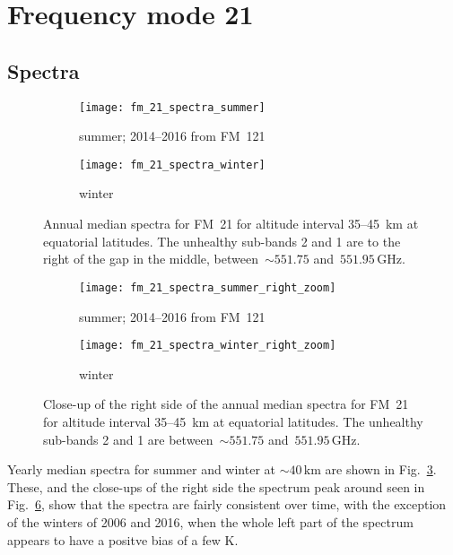 \section{Frequency mode 21}
\label{FM21}

\subsection{Spectra}
\label{FM21:spectra}

\begin{figure}[ht]
    \centering
    \begin{subfigure}[b]{0.9545\textwidth}
        \texttt{[image: fm\_21\_spectra\_summer]}
        \caption{summer; 2014--2016 from FM~121}\label{fig:spectra:21:summer}
    \end{subfigure}
    \begin{subfigure}[b]{0.9545\textwidth}
        \texttt{[image: fm\_21\_spectra\_winter]}
        \caption{winter}\label{fig:spectra:21:winter}
    \end{subfigure}
    \caption{Annual median spectra for FM~21 for altitude interval 35--45~km at
        equatorial latitudes. The unhealthy sub-bands 2 and 1 are to the right
        of the gap in the middle, between~$\sim551.75$
        and~$551.95\,\mathrm{GHz}$.
        }\label{fig:spectra:21}
\end{figure}

\begin{figure}[ht]
    \centering
    \begin{subfigure}[b]{0.9545\textwidth}
        \texttt{[image: fm\_21\_spectra\_summer\_right\_zoom]}
        \caption{summer; 2014--2016 from
            FM~121}\label{fig:spectra:21:summer:closeup}
    \end{subfigure}
    \begin{subfigure}[b]{0.9545\textwidth}
        \texttt{[image: fm\_21\_spectra\_winter\_right\_zoom]}
        \caption{winter}\label{fig:spectra:21:winter:closeup}
    \end{subfigure}
    \caption{Close-up of the right side of the annual median spectra for
        FM~21 for altitude interval 35--45~km at equatorial latitudes.  The
        unhealthy sub-bands 2 and 1 are between~$\sim551.75$
        and~$551.95\,\mathrm{GHz}$.
        }\label{fig:spectra:21:closeup}
\end{figure}

\noindent
Yearly median spectra for summer and winter at $\sim40\,\mathrm{km}$ are shown
in Fig.~\ref{fig:spectra:21}.  These, and the close-ups of the right side the
spectrum peak around seen in Fig.~\ref{fig:spectra:21:closeup}, show that the
spectra are fairly consistent over time, with the exception of the winters of
2006 and 2016, when the whole left part of the spectrum appears to have a
positve bias of a few $\mathrm{K}$.

